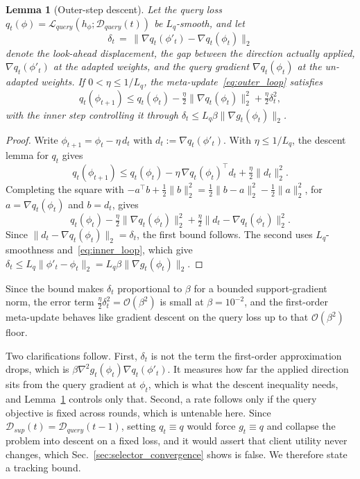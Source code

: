 \documentclass[journal]{IEEEtran}
\newtheorem{Lemma}{Lemma}
\theoremstyle{remark}
\newcommand{\revtwo}[1]{#1}
\begin{document}
{\color{black}
\begin{Lemma}[Outer-step descent]\label{stmt:outer}
Let the query loss $q_t(\phi)=\mathcal{L}_{query}(h_\phi;\mathcal{D}_{query}(t))$ be $L_q$-smooth, and let
\[
\delta_t\,=\,\lVert\nabla q_t(\phi'_t)-\nabla q_t(\phi_t)\rVert_2
\]
denote the \revtwo{\emph{look-ahead displacement}}, the gap between the direction actually applied, $\nabla q_t(\phi'_t)$ at the adapted weights, and the query gradient $\nabla q_t(\phi_t)$ at the un-adapted weights. If $0<\eta\le 1/L_q$, the meta-update~\eqref{eq:outer_loop} satisfies
\[
q_t(\phi_{t+1})\le q_t(\phi_t)-\tfrac{\eta}{2}\lVert\nabla q_t(\phi_t)\rVert_2^2+\tfrac{\eta}{2}\delta_t^2 ,
\]
with the inner step controlling it through $\delta_t\le L_q\beta\lVert\nabla g_t(\phi_t)\rVert_2$.
\end{Lemma}
\begin{proof}
Write $\phi_{t+1}=\phi_t-\eta\,d_t$ with $d_t:=\nabla q_t(\phi'_t)$. With $\eta\le 1/L_q$, the descent lemma for $q_t$ gives
\[
q_t(\phi_{t+1})\le q_t(\phi_t)-\eta\,\nabla q_t(\phi_t)^{\top}d_t+\tfrac{\eta}{2}\lVert d_t\rVert_2^2 .
\]
Completing the square with $-a^{\top}b+\tfrac12\lVert b\rVert_2^2=\tfrac12\lVert b-a\rVert_2^2-\tfrac12\lVert a\rVert_2^2$, for $a=\nabla q_t(\phi_t)$ and $b=d_t$, gives
\[
q_t(\phi_t)-\tfrac{\eta}{2}\lVert\nabla q_t(\phi_t)\rVert_2^2+\tfrac{\eta}{2}\lVert d_t-\nabla q_t(\phi_t)\rVert_2^2 .
\]
Since $\lVert d_t-\nabla q_t(\phi_t)\rVert_2=\delta_t$, the first bound follows. The second uses $L_q$-smoothness and~\eqref{eq:inner_loop}, which give $\delta_t\le L_q\lVert\phi'_t-\phi_t\rVert_2=L_q\beta\lVert\nabla g_t(\phi_t)\rVert_2$.
\end{proof}
Since the bound makes $\delta_t$ proportional to $\beta$ for a bounded support-gradient norm, the error term $\tfrac{\eta}{2}\delta_t^2=\mathcal{O}(\beta^2)$ is \revtwo{small} at $\beta=10^{-2}$, and the first-order meta-update behaves like \revtwo{gradient descent on the query loss up to that $\mathcal{O}(\beta^2)$ floor}.

\revtwo{Two clarifications follow. First, $\delta_t$ is not the term the first-order approximation drops, which is $\beta\nabla^2 g_t(\phi_t)\nabla q_t(\phi'_t)$. It measures how far the applied direction sits from the query gradient at $\phi_t$, which is what the descent inequality needs, and Lemma~\ref{stmt:outer} controls only that. Second, a rate follows only if the query objective is fixed across rounds, which is untenable here. Since $\mathcal{D}_{sup}(t)=\mathcal{D}_{query}(t-1)$, setting $q_t\equiv q$ would force $g_t\equiv q$ and collapse the problem into descent on a fixed loss, and it would assert that client utility never changes, which Sec.~\ref{sec:selector_convergence} shows is false. We therefore state a tracking bound.}

}
\end{document}
